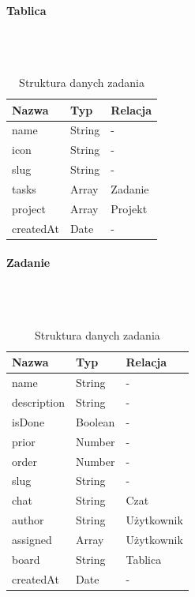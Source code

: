 \documentclass[eng,printmode]{mgr}
\begin{document}
\begin{table}[H]
\centering
\begin{minipage}{.4\textwidth}
\paragraph{Tablica} \ \\ \\
\begin{tabular}{|l|l|l|}
  \hline 
  \textbf{Nazwa} & \textbf{Typ} & \textbf{Relacja}\\
  \hline
  name & String & -\\
  \hline
  icon & String & -\\
  \hline
  slug & String & -\\
  \hline
  tasks & Array & Zadanie\\
  \hline
  project & Array & Projekt\\
  \hline
  createdAt & Date & -\\
  \hline
\end{tabular} 
\caption{Struktura danych tablicy}
\end{minipage}\hfill
\begin{minipage}{.4\textwidth}
\paragraph{Zadanie} \ \\ \\
\begin{tabular}{|l|l|l|}
  \hline 
  \textbf{Nazwa} & \textbf{Typ} & \textbf{Relacja}\\
  \hline
   name & String & -\\
  \hline
   description & String & -\\
  \hline
   isDone & Boolean & -\\
  \hline
   prior & Number & -\\
  \hline
   order & Number & -\\
  \hline
   slug & String & -\\
  \hline
   chat & String & Czat\\
  \hline
   author & String & Użytkownik\\
  \hline
   assigned & Array & Użytkownik\\
  \hline
   board & String & Tablica\\
  \hline
   createdAt & Date & -\\
  \hline
\end{tabular} 
\caption{Struktura danych zadania}
\end{minipage}\hfill
\end{table}
\end{document}
